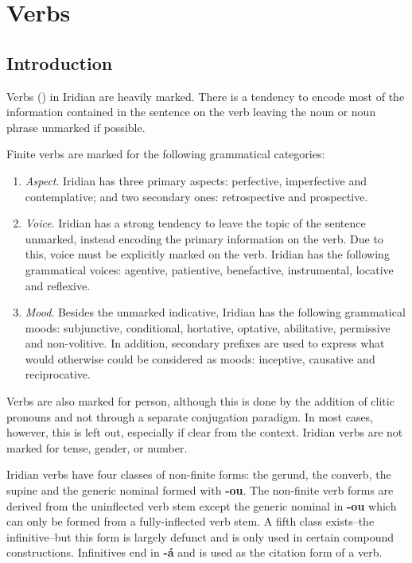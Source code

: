\chapter{Verbs}
\section{Introduction}
Verbs () in Iridian are heavily marked. There is a tendency to encode most of the information contained in the sentence on the verb leaving the noun or noun phrase unmarked if possible.

\par Finite verbs are marked for the following grammatical categories:
\begin{enumerate}[nosep]
	\item \textit{Aspect}. Iridian has three primary aspects: perfective, imperfective and contemplative; and two secondary ones: retrospective and prospective.
	\item \textit{Voice}. Iridian has a strong tendency to leave the topic of the sentence unmarked, instead encoding the primary information on the verb. Due to this, voice must be explicitly marked on the verb. Iridian has the following grammatical voices: agentive, patientive, benefactive, instrumental, locative and reflexive.
	\item \textit{Mood}. Besides the unmarked indicative, Iridian has the following grammatical moods: subjunctive, conditional, hortative, optative, abilitative, permissive and non-volitive. In addition, secondary prefixes are used to express what would otherwise could be considered as moods: inceptive, causative and reciprocative.
\end{enumerate}

Verbs are also marked for person, although this is done by the addition of clitic pronouns and not through a separate conjugation paradigm. In most cases, however, this is left out, especially if clear from the context. Iridian verbs are not marked for tense, gender, or number.

\par Iridian verbs have four classes of non-finite forms: the gerund, the converb, the supine and the generic nominal formed with \textbf{-ou}. The non-finite verb forms are derived from the uninflected verb stem except the generic nominal in \textbf{-ou} which can only be formed from a fully-inflected verb stem. A fifth class exists--the infinitive--but this form is largely defunct and is only used in certain compound constructions. Infinitives end in \textbf{-á} and is used as the citation form of a verb.


